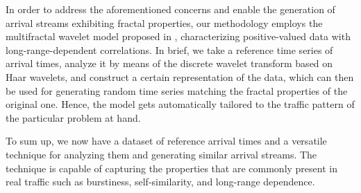 In order to address the aforementioned concerns and enable the generation of
arrival streams exhibiting fractal properties, our methodology employs the
multifractal wavelet model proposed in \cite{riedi1999}, characterizing
positive-valued data with long-range-dependent correlations. In brief, we take a
reference time series of arrival times, analyze it by means of the discrete
wavelet transform based on Haar wavelets, and construct a certain representation
of the data, which can then be used for generating random time series matching
the fractal properties of the original one. Hence, the model gets automatically
tailored to the traffic pattern of the particular problem at hand.

To sum up, we now have a dataset of reference arrival times and a versatile
technique for analyzing them and generating similar arrival streams. The
technique is capable of capturing the properties that are commonly present in
real traffic such as burstiness, self-similarity, and long-range dependence.
